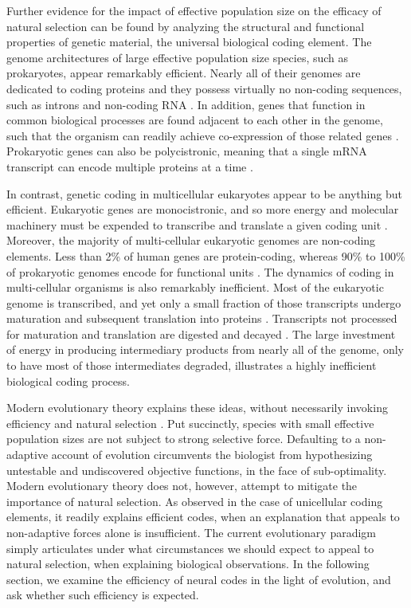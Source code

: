 \documentclass{article}
\begin{document}
Further evidence for the impact of effective population size on the efficacy of natural selection can be found by analyzing the structural and functional properties of genetic material, the universal biological coding element. The genome architectures of large effective population size species, such as prokaryotes, appear remarkably efficient. Nearly all of their genomes are dedicated to coding proteins and they possess virtually no non-coding sequences, such as introns and non-coding RNA \cite{lynch2007origins, milo2016cell}. In addition, genes that function in common biological processes are found adjacent to each other in the genome, such that the organism can readily achieve co-expression of those related genes \cite{overbeek_matlsev_1999}. Prokaryotic genes can also be polycistronic, meaning that a single mRNA transcript can encode multiple proteins at a time \cite{kozak_1999}. 

In contrast, genetic coding in multicellular eukaryotes appear to be anything but efficient. Eukaryotic genes are monocistronic, and so more energy and molecular machinery must be expended to transcribe and translate a given coding unit \cite{kozak_1999}. Moreover, the majority of multi-cellular eukaryotic genomes are non-coding elements. Less than 2\% of human genes are protein-coding, whereas  90\% to 100\% of prokaryotic genomes encode for functional units \cite{milo2016cell}. The dynamics of coding in multi-cellular organisms is also remarkably inefficient. Most of the eukaryotic genome is transcribed, and yet only a small fraction of those transcripts undergo maturation and subsequent translation into proteins \cite{menet_rosbash_2012}. Transcripts not processed for maturation and translation are digested and decayed \cite{mcnicoll_neugebauer_2014}. The large investment of energy in producing intermediary products from nearly all of the genome, only to have most of those intermediates degraded, illustrates a highly inefficient biological coding process. 

Modern evolutionary theory explains these ideas, without necessarily invoking efficiency and natural selection \cite{lynch2007origins}. Put succinctly, species with small effective population sizes are not subject to strong selective force. Defaulting to a non-adaptive account of evolution circumvents the biologist from hypothesizing untestable and undiscovered objective functions, in the face of sub-optimality. Modern evolutionary theory does not, however, attempt to mitigate the importance of natural selection. As observed in the case of unicellular coding elements, it readily explains efficient codes, when an explanation that appeals to non-adaptive forces alone is insufficient. The current evolutionary paradigm simply articulates under what circumstances we should expect to appeal to natural selection, when explaining biological observations. In the following section, we examine the efficiency of neural codes in the light of evolution, and ask whether such efficiency is expected. 
\end{document}
